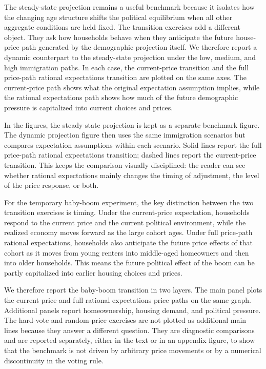 
{\color{blue}
The steady-state projection remains a useful benchmark because it isolates how the changing age structure shifts the political equilibrium when all other aggregate conditions are held fixed. The transition exercises add a different object. They ask how households behave when they anticipate the future house-price path generated by the demographic projection itself. We therefore report a dynamic counterpart to the steady-state projection under the low, medium, and high immigration paths. In each case, the current-price transition and the full price-path rational expectations transition are plotted on the same axes. The current-price path shows what the original expectation assumption implies, while the rational expectations path shows how much of the future demographic pressure is capitalized into current choices and prices.

In the figures, the steady-state projection is kept as a separate benchmark figure. The dynamic projection figure then uses the same immigration scenarios but compares expectation assumptions within each scenario. Solid lines report the full price-path rational expectations transition; dashed lines report the current-price transition. This keeps the comparison visually disciplined: the reader can see whether rational expectations mainly changes the timing of adjustment, the level of the price response, or both.
}


{\color{blue}
For the temporary baby-boom experiment, the key distinction between the two transition exercises is timing. Under the current-price expectation, households respond to the current price and the current political environment, while the realized economy moves forward as the large cohort ages. Under full price-path rational expectations, households also anticipate the future price effects of that cohort as it moves from young renters into middle-aged homeowners and then into older households. This means the future political effect of the boom can be partly capitalized into earlier housing choices and prices.

We therefore report the baby-boom transition in two layers. The main panel plots the current-price and full rational expectations price paths on the same graph. Additional panels report homeownership, housing demand, and political pressure. The hard-vote and random-price exercises are not plotted as additional main lines because they answer a different question. They are diagnostic comparisons and are reported separately, either in the text or in an appendix figure, to show that the benchmark is not driven by arbitrary price movements or by a numerical discontinuity in the voting rule.
}

